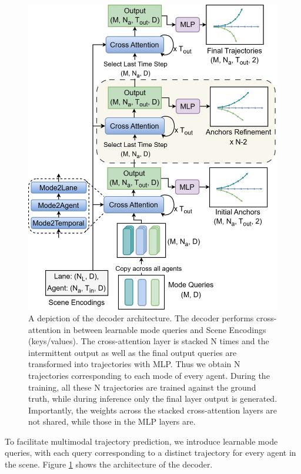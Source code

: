 \begin{figure}
    \centering
    \includegraphics[width=1.\linewidth]{images/lane_based_prediction_decoder_paper.jpg}
    \caption{A depiction of the decoder architecture. The decoder performs cross-attention in between learnable mode queries and Scene Encodings (keys/values). The cross-attention layer is stacked N times and the intermittent output as well as the final output queries are transformed into trajectories with MLP. Thus we obtain N trajectories corresponding to each mode of every agent. During the training, all these N trajectories are trained against the ground truth, while during inference only the final layer output is generated. Importantly, the weights across the stacked cross-attention layers are not shared, while those in the MLP layers are.}
    \label{fig:decoder}
\end{figure}

To facilitate multimodal trajectory prediction, we introduce learnable mode queries, with each query corresponding to a distinct trajectory for every agent in the scene. Figure \ref{fig:decoder} shows the architecture of the decoder.

